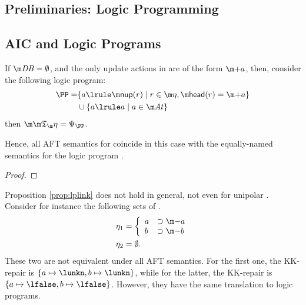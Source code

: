 \subsection{Preliminaries: Logic Programming}


\subsection{AIC and Logic Programs}

\begin{proposition}\label{prop:lplink}
 If $\db=\emptyset$, and the only update actions in \aics are of the form $\add a$, then, consider the following logic program: 
 \begin{align*}
  \PP =& \{a \lrule \nup(r)\mid r\in \aics, \head(r)= \add a\}\\
  &\cup \{a \lrule a\mid a \in \atoms\}
 \end{align*}
then $\Ap = \Psi_\PP$. 

Hence, all AFT semantics for \fulldb coincide in this case with the equally-named semantics for the logic program \PP. 
\end{proposition}
\begin{proof}
\end{proof}

\begin{example}
 Proposition \ref{prop:lplink} does not hold in general, not even for unipolar \aics. 
 Consider for instance the following sets of \aics. 
 \begin{align*}\eta_1 &= \left\{\begin{array}{ll}
                    a &\aicrule \remove a\\
                    b & \aicrule \remove b
                   \end{array}\right.\\
                   \eta_2 &=\emptyset.
\end{align*}
These two are not equivalent under all AFT semantics. 
For the first one, the KK-repair is $\{a\mapsto\lunkn,b\mapsto\lunkn\}$, while for the latter, the KK-repair is $\{a\mapsto\lfalse,b\mapsto\lfalse\}$. However, they have the same translation to logic programs.          
%                    
% 
\end{example}


